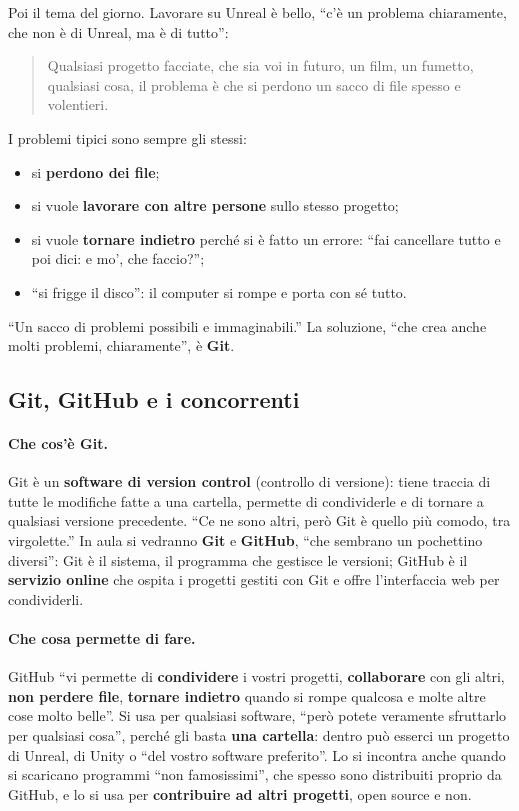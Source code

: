 Poi il tema del giorno. Lavorare su Unreal è bello, ``c'è un problema
chiaramente, che non è di Unreal, ma è di tutto'':
\begin{quote}
Qualsiasi progetto facciate, che sia voi in futuro, un film, un fumetto,
qualsiasi cosa, il problema è che si perdono un sacco di file spesso e
volentieri.
\end{quote}
I problemi tipici sono sempre gli stessi:
\begin{itemize}
  \item si \textbf{perdono dei file};
  \item si vuole \textbf{lavorare con altre persone} sullo stesso progetto;
  \item si vuole \textbf{tornare indietro} perché si è fatto un errore: ``fai
        cancellare tutto e poi dici: e mo', che faccio?'';
  \item ``si frigge il disco'': il computer si rompe e porta con sé tutto.
\end{itemize}
``Un sacco di problemi possibili e immaginabili.'' La soluzione, ``che crea
anche molti problemi, chiaramente'', è \textbf{Git}.

\subsection{Git, GitHub e i concorrenti}

\paragraph{Che cos'è Git.} Git è un \textbf{software di version control}
(controllo di versione): tiene traccia di tutte le modifiche fatte a una
cartella, permette di condividerle e di tornare a qualsiasi versione
precedente. ``Ce ne sono altri, però Git è quello più comodo, tra virgolette.''
In aula si vedranno \textbf{Git} e \textbf{GitHub}, ``che sembrano un
pochettino diversi'': Git è il sistema, il programma che gestisce le versioni;
GitHub è il \textbf{servizio online} che ospita i progetti gestiti con Git e
offre l'interfaccia web per condividerli.

\paragraph{Che cosa permette di fare.} GitHub ``vi permette di
\textbf{condividere} i vostri progetti, \textbf{collaborare} con gli altri,
\textbf{non perdere file}, \textbf{tornare indietro} quando si rompe qualcosa e
molte altre cose molto belle''. Si usa per qualsiasi software, ``però potete
veramente sfruttarlo per qualsiasi cosa'', perché gli basta \textbf{una
cartella}: dentro può esserci un progetto di Unreal, di Unity o ``del vostro
software preferito''. Lo si incontra anche quando si scaricano programmi ``non
famosissimi'', che spesso sono distribuiti proprio da GitHub, e lo si usa per
\textbf{contribuire ad altri progetti}, open source e non.

